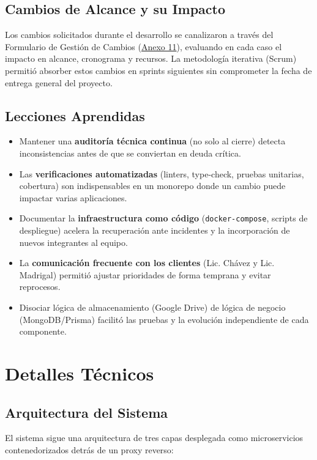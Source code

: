 \subsection{Cambios de Alcance y su Impacto}

Los cambios solicitados durante el desarrollo se canalizaron a través del Formulario de Gestión de Cambios (\hyperref[anexo:formulario_gestion_de_cambios]{Anexo 11}), evaluando en cada caso el impacto en alcance, cronograma y recursos. La metodología iterativa (Scrum) permitió absorber estos cambios en sprints siguientes sin comprometer la fecha de entrega general del proyecto.

\subsection{Lecciones Aprendidas}

\begin{itemize}
    \item Mantener una \textbf{auditoría técnica continua} (no solo al cierre) detecta inconsistencias antes de que se conviertan en deuda crítica.
    \item Las \textbf{verificaciones automatizadas} (linters, type-check, pruebas unitarias, cobertura) son indispensables en un monorepo donde un cambio puede impactar varias aplicaciones.
    \item Documentar la \textbf{infraestructura como código} (\texttt{docker-compose}, scripts de despliegue) acelera la recuperación ante incidentes y la incorporación de nuevos integrantes al equipo.
    \item La \textbf{comunicación frecuente con los clientes} (Lic. Chávez y Lic. Madrigal) permitió ajustar prioridades de forma temprana y evitar reprocesos.
    \item Disociar lógica de almacenamiento (Google Drive) de lógica de negocio (MongoDB/Prisma) facilitó las pruebas y la evolución independiente de cada componente.
\end{itemize}

\section{Detalles Técnicos}

\subsection{Arquitectura del Sistema}

El sistema sigue una arquitectura de tres capas desplegada como microservicios contenedorizados detrás de un proxy reverso:

